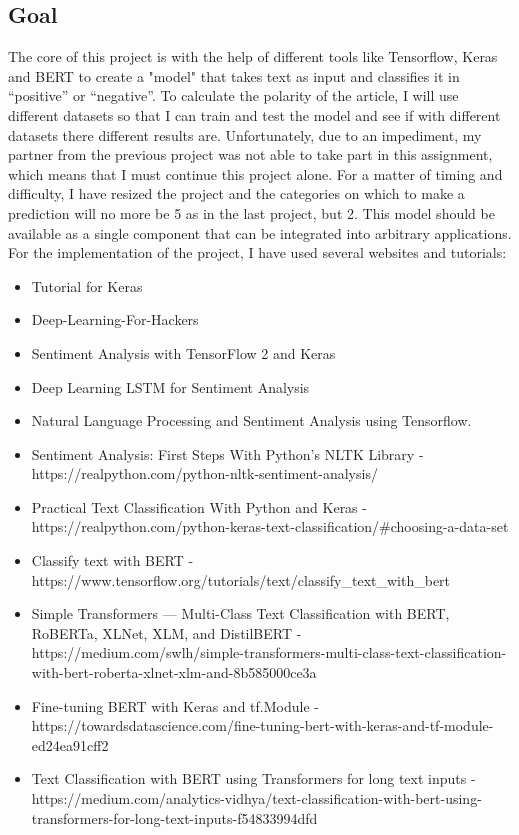 \subsection[Goal]{Goal}
\label{main}
The core of this project is with the help of different tools like Tensorflow\cite{tensorflow}, Keras and BERT to create a "model" that takes text as input and classifies it in “positive” or “negative”. 
To calculate the polarity of the article, I will use different datasets so that I can train and test the model and see if with different datasets there different results are.
Unfortunately, due to an impediment, my partner from the previous project was not able to take part in this assignment, which means that I must continue this project alone.
For a matter of timing and difficulty, I have resized the project and the categories on which to make a prediction will no more be 5 as in the last project, but 2.
This model should be available as a single component that can be integrated into arbitrary applications.\\
For the implementation of the project, I have used several websites and tutorials:
\begin{itemize}
    \item Tutorial for Keras\cite{tutorial_keras}
    \item Deep-Learning-For-Hackers\cite{git}
    \item Sentiment Analysis with TensorFlow 2 and Keras\cite{tutorial}
    \item Deep Learning LSTM for Sentiment Analysis\cite{karikari_deep_2020}
    \item Natural Language Processing and Sentiment Analysis using Tensorflow.\cite{khan_natural_2020}
    \item Sentiment Analysis: First Steps With Python's NLTK Library - https://realpython.com/python-nltk-sentiment-analysis/
    \item Practical Text Classification With Python and Keras - https://realpython.com/python-keras-text-classification/#choosing-a-data-set
    \item Classify text with BERT - https://www.tensorflow.org/tutorials/text/classify_text_with_bert
    \item Simple Transformers — Multi-Class Text Classification with BERT, RoBERTa, XLNet, XLM, and DistilBERT - https://medium.com/swlh/simple-transformers-multi-class-text-classification-with-bert-roberta-xlnet-xlm-and-8b585000ce3a
    \item Fine-tuning BERT with Keras and tf.Module - https://towardsdatascience.com/fine-tuning-bert-with-keras-and-tf-module-ed24ea91cff2
    \item Text Classification with BERT using Transformers for long text inputs - https://medium.com/analytics-vidhya/text-classification-with-bert-using-transformers-for-long-text-inputs-f54833994dfd
    
\end{itemize}


